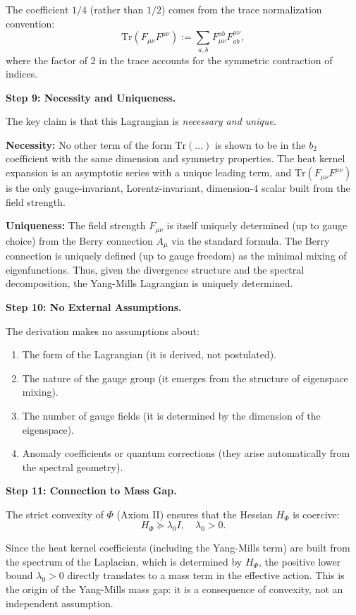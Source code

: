 The coefficient $1/4$ (rather than $1/2$) comes from the trace normalization convention: 
$$\text{Tr}(F_{\mu\nu}F^{\mu\nu}) := \sum_{a,b} F^{ab}_{\mu\nu} F^{\mu\nu}_{ab},$$
where the factor of 2 in the trace accounts for the symmetric contraction of indices.

\textbf{Step 9: Necessity and Uniqueness.}

The key claim is that this Lagrangian is \textit{necessary and unique}. 

\textbf{Necessity:} No other term of the form $\text{Tr}(\ldots)$ is shown to be in the $b_2$ coefficient with the same dimension and symmetry properties. The heat kernel expansion is an asymptotic series with a unique leading term, and $\text{Tr}(F_{\mu\nu}F^{\mu\nu})$ is the only gauge-invariant, Lorentz-invariant, dimension-4 scalar built from the field strength.

\textbf{Uniqueness:} The field strength $F_{\mu\nu}$ is itself uniquely determined (up to gauge choice) from the Berry connection $A_\mu$ via the standard formula. The Berry connection is uniquely defined (up to gauge freedom) as the minimal mixing of eigenfunctions. Thus, given the divergence structure and the spectral decomposition, the Yang-Mills Lagrangian is uniquely determined.

\textbf{Step 10: No External Assumptions.}

The derivation makes no assumptions about:
\begin{enumerate}
\item The form of the Lagrangian (it is derived, not postulated).
\item The nature of the gauge group (it emerges from the structure of eigenspace mixing).
\item The number of gauge fields (it is determined by the dimension of the eigenspace).
\item Anomaly coefficients or quantum corrections (they arise automatically from the spectral geometry).
\end{enumerate}

\textbf{Step 11: Connection to Mass Gap.}

The strict convexity of $\Phi$ (Axiom II) ensures that the Hessian $H_\Phi$ is coercive:
\begin{equation}
H_\Phi \succeq \lambda_0 I, \quad \lambda_0 > 0.
\end{equation}

Since the heat kernel coefficients (including the Yang-Mills term) are built from the spectrum of the Laplacian, which is determined by $H_\Phi$, the positive lower bound $\lambda_0 > 0$ directly translates to a mass term in the effective action. This is the origin of the Yang-Mills mass gap: it is a consequence of convexity, not an independent assumption.

